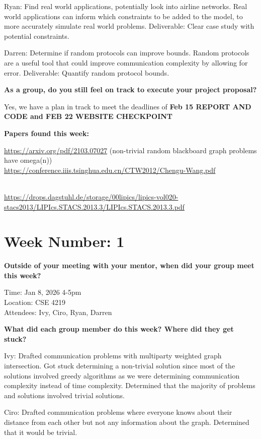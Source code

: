 Ryan: Find real world applications, potentially look into airline
networks. Real world applications can inform which constraints to be
added to the model, to more accurately simulate real world problems.
Deliverable: Clear case study with potential constraints.

Darren: Determine if random protocols can improve bounds. Random
protocols are a useful tool that could improve communication complexity
by allowing for error. Deliverable: Quantify random protocol bounds.

\textbf{As a group, do you still feel on track to execute your project
proposal?}

Yes, we have a plan in track to meet the deadlines of \textbf{Feb 15
REPORT AND CODE and FEB 22 WEBSITE CHECKPOINT}

\textbf{Papers found this week:}

\url{https://arxiv.org/pdf/2103.07027} (non-trivial random blackboard
graph problems have omega(n))\\
\url{https://conference.iiis.tsinghua.edu.cn/CTW2012/Chengu-Wang.pdf}\strut \\
\url{https://drops.dagstuhl.de/storage/00lipics/lipics-vol020-stacs2013/LIPIcs.STACS.2013.3/LIPIcs.STACS.2013.3.pdf}


\section{\texorpdfstring{\textbf{Week Number:
1}}{Week Number: 1}}\label{week-number-1}

\textbf{Outside of your meeting with your mentor, when did your group
meet this week?}

Time: Jan 8, 2026 4-5pm\\
Location: CSE 4219\\
Attendees: Ivy, Ciro, Ryan, Darren

\textbf{What did each group member do this week? Where did they get
stuck?}

Ivy: Drafted communication problems with multiparty weighted graph
intersection. Got stuck determining a non-trivial solution since most of
the solutions involved greedy algorithms as we were determining
communication complexity instead of time complexity. Determined that the
majority of problems and solutions involved trivial solutions.

Ciro: Drafted communication problems where everyone knows about their
distance from each other but not any information about the graph.
Determined that it would be trivial.

